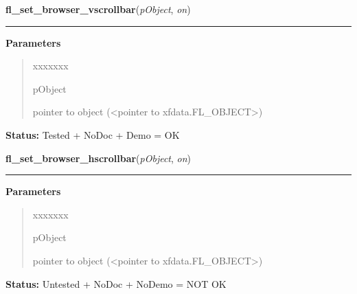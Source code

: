 \hspace{.8\funcindent}\begin{boxedminipage}{\funcwidth}

    \raggedright \textbf{fl\_set\_browser\_vscrollbar}(\textit{pObject}, \textit{on})

    \vspace{-1.5ex}

    \rule{\textwidth}{0.5\fboxrule}
\setlength{\parskip}{2ex}
\setlength{\parskip}{1ex}
      \textbf{Parameters}
      \vspace{-1ex}

      \begin{quote}
        \begin{Ventry}{xxxxxxx}

          \item[pObject]

          pointer to object ({\textless}pointer to 
          xfdata.FL\_OBJECT{\textgreater})

        \end{Ventry}

      \end{quote}

\textbf{Status:} Tested + NoDoc + Demo = OK



    \end{boxedminipage}

    \label{xformslib:library:fl_set_browser_hscrollbar}

    \vspace{0.5ex}

\hspace{.8\funcindent}\begin{boxedminipage}{\funcwidth}

    \raggedright \textbf{fl\_set\_browser\_hscrollbar}(\textit{pObject}, \textit{on})

    \vspace{-1.5ex}

    \rule{\textwidth}{0.5\fboxrule}
\setlength{\parskip}{2ex}
\setlength{\parskip}{1ex}
      \textbf{Parameters}
      \vspace{-1ex}

      \begin{quote}
        \begin{Ventry}{xxxxxxx}

          \item[pObject]

          pointer to object ({\textless}pointer to 
          xfdata.FL\_OBJECT{\textgreater})

        \end{Ventry}

      \end{quote}

\textbf{Status:} Untested + NoDoc + NoDemo = NOT OK



    \end{boxedminipage}

